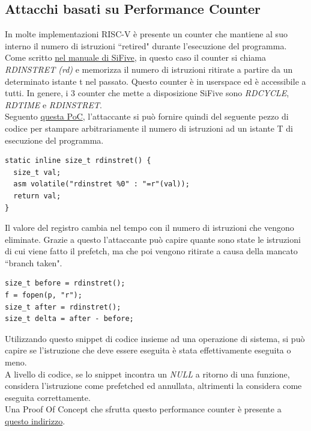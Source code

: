 \subsection*{Attacchi basati su Performance Counter}
In molte implementazioni RISC-V è presente un counter che mantiene al suo interno il numero di istruzioni ``retired" durante l'esecuzione del programma. Come scritto \href{https://www.scs.stanford.edu/~zyedidia/docs/sifive/sifive-u74.pdf}{nel manuale di SiFive}, in questo caso il counter si chiama \textit{RDINSTRET (rd)} e memorizza il numero di istruzioni ritirate a partire da un determinato istante t nel passato. Questo counter è in userspace ed è accessibile a tutti. In genere, i 3 counter che mette a disposizione SiFive sono \textit{RDCYCLE}, \textit{RDTIME} e \textit{RDINSTRET}.\\
\newline
Seguento \href{https://github.com/cispa/Security-RISC/blob/main/rlibsc.h}{questa PoC}, l'attaccante si può fornire quindi del seguente pezzo di codice per stampare arbitrariamente il numero di istruzioni ad un istante T di esecuzione del programma.
\begin{verbatim}
static inline size_t rdinstret() {
  size_t val;
  asm volatile("rdinstret %0" : "=r"(val));
  return val;
}
\end{verbatim}
Il valore del registro cambia nel tempo con il numero di istruzioni che vengono eliminate. Grazie a questo l'attaccante può capire quante sono state le istruzioni di cui viene fatto il prefetch, ma che poi vengono ritirate a causa della mancato ``branch taken".
\begin{verbatim}
size_t before = rdinstret();
f = fopen(p, "r");
size_t after = rdinstret();
size_t delta = after - before;
\end{verbatim}
Utilizzando questo snippet di codice insieme ad una operazione di sistema, si può capire se l'istruzione che deve essere eseguita è stata effettivamente eseguita o meno.\\
A livello di codice, se lo snippet incontra un \textit{NULL} a ritorno di una funzione, considera l'istruzione come prefetched ed annullata, altrimenti la considera come eseguita correttamente.\\
\newline
Una Proof Of Concept che sfrutta questo performance counter è presente a \href{https://github.com/cispa/Security-RISC/tree/main/access-retired}{questo indirizzo}.\\
